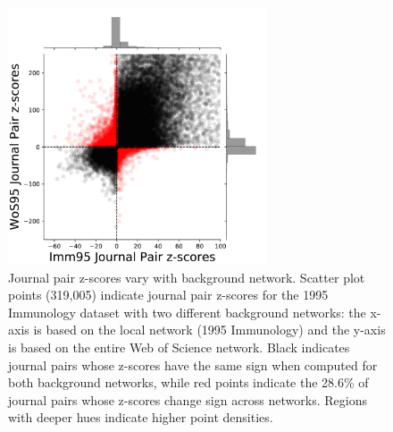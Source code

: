 \documentclass[NETN]{stjour}
\begin{document}
\begin{figure}%
\centering
\includegraphics[width=3in]{fig2_scatter_z_scores_flattened.pdf}     %
\caption{Journal pair z-scores vary with background network. 
Scatter plot points (319,005) indicate journal pair z-scores for the 1995 Immunology dataset with two different background networks: the x-axis is based on the local network (1995 Immunology) and the y-axis is based on the entire Web of Science network. Black indicates journal pairs whose z-scores have the same sign when computed for both background networks, while red points indicate the 28.6\% of journal pairs whose z-scores change sign across networks. Regions with deeper hues indicate higher point densities. } %
\label{fig:scatter}
\end{figure}

\end{document}
